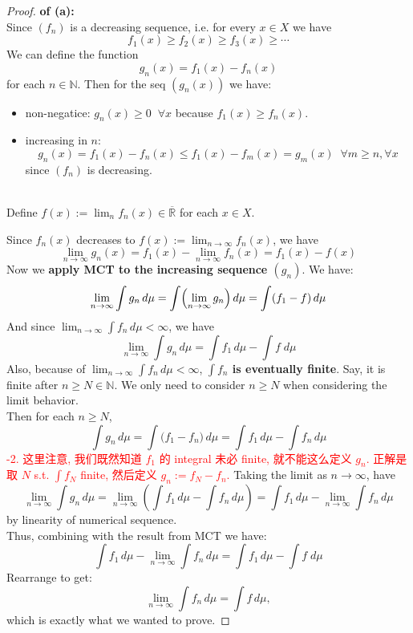 \documentclass[lang=cn,11pt]{elegantbook}
\begin{document}
\begin{proof}
\textbf{of (a):}\\
Since \((f_n)\) is a decreasing sequence, i.e. for every \(x\in X\) we have
\[
f_1(x) \ge f_2(x) \ge f_3(x) \ge \cdots 
\]
We can define the function
\[
g_n(x) = f_1(x) - f_n(x)
\] for each $n \in \mathbb{N}$. Then for the seq $(g_n(x))$ we have:
\begin{itemize}
    \item non-negatice: \(g_n(x) \ge 0 \;\; \forall x\) because \(f_1(x) \ge f_n(x)\).
    \item  increasing in $n$:\[
  g_n(x) = f_1(x) - f_n(x) \le f_1(x) - f_m(x) = g_m(x) \;\;\forall  m\geq n, \forall x
  \] since \((f_n)\) is decreasing.\\\\
\end{itemize}

Define $f(x) := \lim_n f_n(x) \in \overline{\mathbb{R}}$ for each $x \in X$.

Since \(f_n(x)\) decreases to \(f(x):=\lim_{n\to\infty} f_n(x)\), we have \[
  \lim_{n\to\infty} g_n(x) = f_1(x) - \lim_{n\to\infty} f_n(x) = f_1(x) - f(x)
  \]
Now we \textbf{apply MCT to the increasing sequence \((g_n)\)}. We have:
\[
\lim_{n\to\infty} \int g_n\,d\mu = \int \Bigl(\lim_{n\to\infty} g_n\Bigr)\,d\mu = \int (f_1 - f)\,d\mu
\]
And since \(\lim_{n\to\infty}\int f_n\,d\mu < \infty\), we have\[
\lim_{n\to\infty} \int g_n\,d\mu = \int f_1 \, d\mu - \int f \;d\mu
\] Also, because of \(\lim_{n\to\infty}\int f_n\,d\mu < \infty\), \textbf{$\int f_n $ is eventually finite}. Say, it is finite after $n\geq N \in \mathbb{N}$. We only need to consider $n\geq N$ when considering the limit behavior.\\
Then for each \(n \geq N\),
\[
\int g_n\,d\mu = \int \bigl(f_1 - f_n\bigr)\,d\mu = \int f_1\,d\mu - \int f_n\,d\mu
\]
\textcolor{red}{-2. 这里注意, 我们既然知道 $f_1$ 的 integral 未必 finite, 就不能这么定义 $g_n$. 正解是取 $N$ s.t. $\int f_N$ finite, 然后定义 $g_n := f_N - f_n$.}
Taking the limit as \(n\to\infty\), have
\[
\lim_{n\to\infty} \int g_n\,d\mu = \lim_{n\to\infty} \left(\int f_1\,d\mu - \int f_n\,d\mu\right) = \int f_1\,d\mu - \lim_{n\to\infty} \int f_n\,d\mu
\]
by linearity of numerical sequence.\\
Thus, combining with the result from MCT we have:
\[
\int f_1\,d\mu - \lim_{n\to\infty} \int f_n\,d\mu =  \int f_1 \,d\mu- \int f \;d\mu
\]
Rearrange to get:
\[
\lim_{n\to\infty} \int f_n\,d\mu = \int f\,d\mu,
\]
which is exactly what we wanted to prove.
\end{proof}
\end{document}
